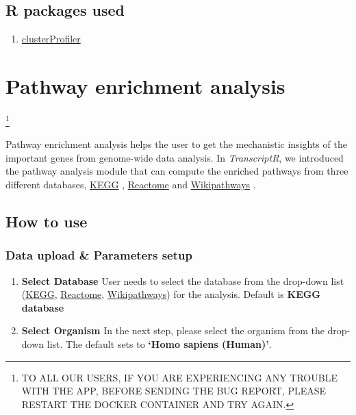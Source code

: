 \documentclass[
  a4paper,
  oneside,
  open=any]{scrreport}
\providecommand{\tightlist}{%
  \setlength{\itemsep}{0pt}\setlength{\parskip}{0pt}}\usepackage{longtable,booktabs,array}
\begin{document}
\hypertarget{r-packages-used-2}{%
\section{R packages used}\label{r-packages-used-2}}

\begin{enumerate}
\def\labelenumi{\arabic{enumi}.}
\tightlist
\item
  \href{https://bioconductor.org/packages/release/bioc/vignettes/clusterProfiler/inst/doc/clusterProfiler.html}{clusterProfiler}
\end{enumerate}

\hypertarget{sec-pathway}{%
\chapter{Pathway enrichment analysis}\label{sec-pathway}}

\footnote{TO ALL OUR USERS, IF YOU ARE EXPERIENCING ANY TROUBLE WITH THE
  APP, BEFORE SENDING THE BUG REPORT, PLEASE RESTART THE DOCKER
  CONTAINER AND TRY AGAIN.}

Pathway enrichment analysis helps the user to get the mechanistic
insights of the important genes from genome-wide data analysis. In
\emph{TranscriptR}, we introduced the pathway analysis module that can
compute the enriched pathways from three different databases,
\href{https://www.genome.jp/kegg/}{KEGG} \autocite{Kanehisa2000},
\href{https://reactome.org/}{Reactome} \autocite{Gillespie2021} and
\href{https://www.wikipathways.org/}{Wikipathways}
\autocite{pico2008plos,martens2020nar}.

\hypertarget{how-to-use-5}{%
\section{How to use}\label{how-to-use-5}}

\hypertarget{data-upload-parameters-setup-1}{%
\subsection{Data upload \& Parameters
setup}\label{data-upload-parameters-setup-1}}

\begin{enumerate}
\def\labelenumi{\arabic{enumi}.}
\item
  \textbf{Select Database} User needs to select the database from the
  drop-down list (\href{https://www.genome.jp/kegg/}{KEGG},
  \href{https://reactome.org/}{Reactome},
  \href{https://www.wikipathways.org/}{Wikipathways}) for the analysis.
  Default is \textbf{KEGG database}
\item
  \textbf{Select Organism} In the next step, please select the organism
  from the drop-down list. The default sets to \textbf{`Homo sapiens
  (Human)'}.
\end{enumerate}
\end{document}
